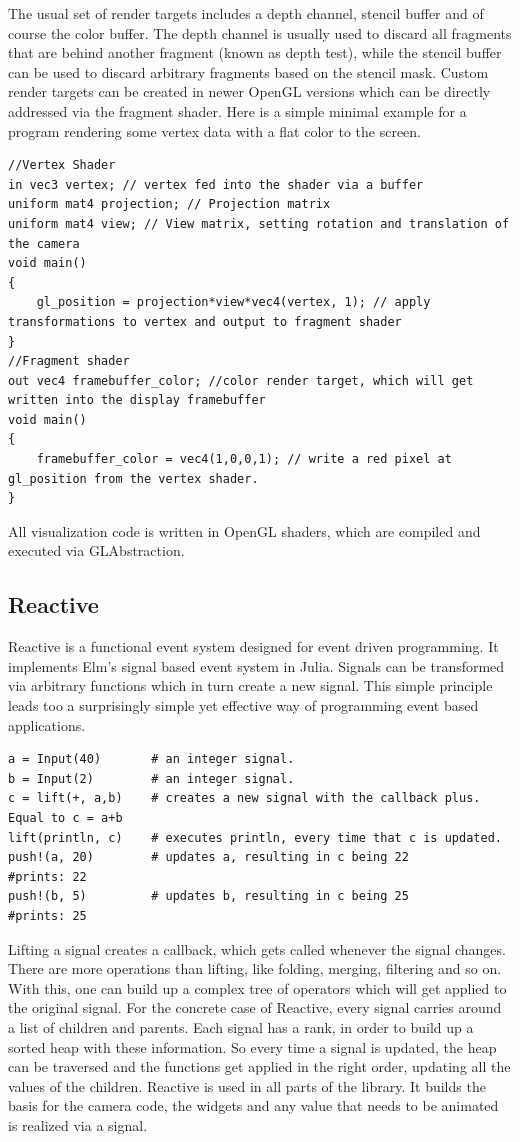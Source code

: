 The usual set of render targets includes a depth channel, stencil buffer and of course the color buffer.
The depth channel is usually used to discard all fragments that are behind another fragment (known as depth test), while the stencil buffer can be used to discard arbitrary fragments based on the stencil mask. 
Custom render targets can be created in newer OpenGL versions which can be directly addressed via the fragment shader.
Here is a simple minimal example for a program rendering some vertex data with a flat color to the screen.

\begin{lstlisting}
//Vertex Shader
in vec3 vertex; // vertex fed into the shader via a buffer
uniform mat4 projection; // Projection matrix
uniform mat4 view; // View matrix, setting rotation and translation of the camera
void main()
{
    gl_position = projection*view*vec4(vertex, 1); // apply transformations to vertex and output to fragment shader
}
//Fragment shader
out vec4 framebuffer_color; //color render target, which will get written into the display framebuffer
void main()
{
    framebuffer_color = vec4(1,0,0,1); // write a red pixel at gl_position from the vertex shader.
}
\end{lstlisting}

All visualization code is written in OpenGL shaders, which are compiled and executed via GLAbstraction.

\subsection{Reactive}
Reactive\cite{Reactive} is a functional event system designed for event driven programming.
It implements Elm's\cite{Elm} signal based event system in Julia.
Signals can be transformed via arbitrary functions which in turn create a new signal.
This simple principle leads too a surprisingly simple yet effective way of programming event based applications.

\begin{lstlisting}
a = Input(40)       # an integer signal.
b = Input(2)        # an integer signal.
c = lift(+, a,b)    # creates a new signal with the callback plus. Equal to c = a+b
lift(println, c)    # executes println, every time that c is updated. 
push!(a, 20)        # updates a, resulting in c being 22
#prints: 22
push!(b, 5)         # updates b, resulting in c being 25
#prints: 25
\end{lstlisting}

Lifting a signal creates a callback, which gets called whenever the signal changes.
There are more operations than lifting, like folding, merging, filtering and so on.
With this, one can build up a complex tree of operators which will get applied to the original signal.
For the concrete case of Reactive, every signal carries around a list of children and parents.
Each signal has a rank, in order to build up a sorted heap with these information.
So every time a signal is updated, the heap can be traversed and the functions get applied in the right order, updating all the values of the children.
Reactive is used in all parts of the library. It builds the basis for the camera code, the widgets and any value that needs to be animated is realized via a signal.

